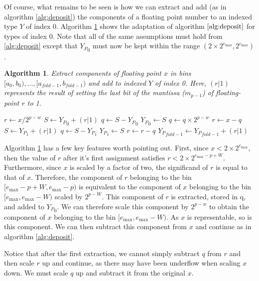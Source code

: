 \documentclass[12pt]{article}
\providecommand{\max}{\ensuremath{\text{max}}}
\theoremstyle{plain}
\newtheorem{alg}{Algorithm}[section]
\begin{document}
      Of course, what remains to be seen is how we can extract and add (as in algorithm \ref{alg:deposit}) the components of a floating point number to an indexed type $Y$ of index 0. Algorithm \ref{alg:deposit0} shows the adaptation of algorithm $\ref{alg:deposit}$ for types of index 0. Note that all of the same assumptions must hold from \ref{alg:deposit} except that ${Y_P}_0$ must now be kept within the range $(2 \times 2^{e_{\max}}, 2^{e_{\max}})$.
      \begin{alg}
        Extract components of floating point $x$ in bins $[a_0, b_0), ..., [a_{fold - 1}, b_{fold - 1})$ and add to indexed $Y$ of index 0. Here, $(r | 1)$ represents the result of setting the last bit of the mantissa ($m_{p - 1}$) of floating-point $r$ to 1.
        \begin{algorithmic}
            \State $r \gets x / 2^{p - w}$
            \State $S \gets {Y_P}_0 + (r | 1)$
            \State $q \gets S - {Y_P}_0$
            \State ${Y_P}_0 \gets S$
            \State $q \gets q \times 2^{p - w}$
            \State $r \gets x - q$
              \State $S \gets {Y_P}_i + (r | 1)$
              \State $q \gets S - {Y_P}_i$
              \State ${Y_P}_i \gets S$
              \State $r \gets r - q$
            \EndFor
            \State ${Y_P}_{fold - 1} \gets {Y_P}_{fold - 1} + (r | 1)$
          \EndFunction
        \end{algorithmic}
        \label{alg:deposit0}
      \end{alg}

      Algorithm \ref{alg:deposit0} has a few key features worth pointing out. First, since $x < 2 \times 2^{e_{\max}}$, then the value of $r$ after it's first assignment satisfies $r < 2 \times 2^{e_{\max} - p + W}$.
      Furthermore, since $x$ is scaled by a factor of two, the significand of $r$ is equal to that of $x$.
      Therefore, the component of $r$ belonging to the bin $[e_{\max} - p + W, e_{\max} - p)$ is equivalent to the component of $x$ belonging to the bin $[e_{\max}, e_{\max} - W)$ scaled by $2^{p - W}$. This component of $r$ is extracted, stored in q, and added to ${Y_P}_0$. We can therefore scale this component by $2^{p - w}$ to obtain the component of $x$ belonging to the bin $[e_{\max}, e_{\max} - W)$. As $x$ is representable, so is this component. We can then subtract this component from $x$ and continue as in algorithm \ref{alg:deposit}.

      Notice that after the first extraction, we cannot simply subtract $q$ from $r$ and then scale $r$ up and continue, as there may have been underflow when scaling $x$ down. We must scale $q$ up and subtract it from the original $x$.
\end{document}
